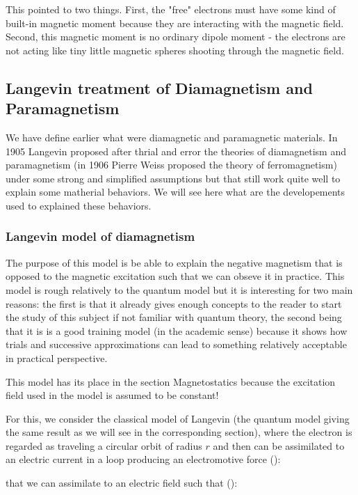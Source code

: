 	This pointed to two things. First, the "free" electrons must have some kind of built-in magnetic moment because they are interacting with the magnetic field. Second, this magnetic moment is no ordinary dipole moment - the electrons are not acting like tiny little magnetic spheres shooting through the magnetic field.
	
	\pagebreak
	\subsection{Langevin treatment of Diamagnetism and Paramagnetism}
	We have define earlier what were diamagnetic and paramagnetic materials. In 1905 Langevin proposed after thrial and error the theories of diamagnetism and paramagnetism (in 1906 Pierre Weiss proposed the theory of ferromagnetism) under some strong and simplified assumptions but that still work quite well to explain some matherial behaviors. We will see here what are the developements used to explained these behaviors.
	
	\subsubsection{Langevin model of diamagnetism}
	The purpose of this model is be able to explain the negative magnetism that is opposed to the magnetic excitation such that we can obseve it in practice. This model is rough relatively to the quantum model but it is interesting for two main reasons: the first is that it already gives enough concepts to the reader to start the study of this subject if not familiar with quantum theory, the second being that it is is a good training model (in the academic sense) because it shows how trials and successive approximations can lead to something relatively acceptable in practical perspective.
	\begin{tcolorbox}[title=Remark,colframe=black,arc=10pt]
	This model has its place in the section Magnetostatics because the excitation field used in the model is assumed to be constant!
	\end{tcolorbox}
	For this, we consider the classical model of Langevin (the quantum model giving the same result as we will see in the corresponding section), where the electron is regarded as traveling a circular orbit of radius $r$ and then can be assimilated to an electric current in a loop producing an electromotive force ():
	
	that we can assimilate to an electric field such that ():
	

